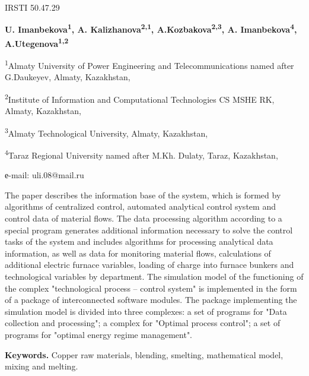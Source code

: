 IRSTI 50.47.29


\begin{center}
{\bfseries U. Imanbekova\textsuperscript{1}, A.
Kalizhanova\textsuperscript{2,1}, A.Kozbakova\textsuperscript{2,3}, A.
Imanbekova\textsuperscript{4}, A.Utegenova\textsuperscript{1,2}}

\textsuperscript{1}Almaty University of Power Engineering and
Telecommunications named after G.Daukeyev, Almaty, Kazakhstan,

\textsuperscript{2}Institute of Information and Computational
Technologies CS MSHE RK, Almaty, Kazakhstan,

\textsuperscript{3}Almaty Technological University, Almaty, Kazakhstan,

\textsuperscript{4}Taraz Regional University named after M.Kh. Dulaty,
Taraz, Kazakhstan,

е-mail: uli.08@mail.ru
\end{center}

The paper describes the information base of the system, which is formed
by algorithms of centralized control, automated analytical control
system and control data of material flows. The data processing algorithm
according to a special program generates additional information
necessary to solve the control tasks of the system and includes
algorithms for processing analytical data information, as well as data
for monitoring material flows, calculations of additional electric
furnace variables, loading of charge into furnace bunkers and
technological variables by department. The simulation model of the
functioning of the complex "technological process -- control system" is
implemented in the form of a package of interconnected software modules.
The package implementing the simulation model is divided into three
complexes: a set of programs for "Data collection and processing"; a
complex for "Optimal process control"; a set of programs for "optimal
energy regime management".

{\bfseries Keywords.} Copper raw materials, blending, smelting,
mathematical model, mixing and melting.


